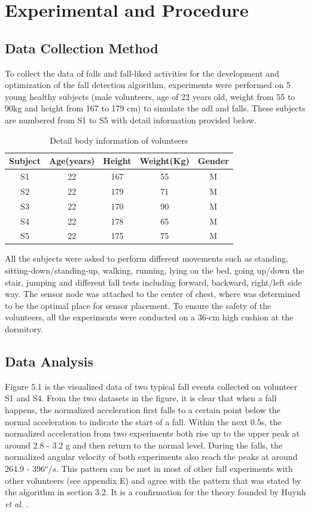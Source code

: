 \documentclass[letterpaper,12pt,titlepage,oneside,final]{book}
\begin{document}
\chapter{Experimental and Procedure}

\section{Data Collection Method}
To collect the data of falls and fall-liked activities for the development and optimization of the fall detection algorithm, experiments were performed on 5 young healthy subjects (male volunteers, age of 22 years old, weight from 55 to 90kg and height from 167 to 179 cm) to simulate the \gls{adl} and falls. These subjects are numbered from S1 to S5 with detail information provided below.
\begin{table}[h]
	\begin{center}
		\begin{tabular}{ |c|c|c|c|c| } 
			\hline
			Subject & Age(years) & Height & Weight(Kg) & Gender \\
			\hline
			S1 & 22 & 167 & 55 & M\\ %
			S2 & 22 & 179 & 71 & M\\ %
			S3 & 22 & 170 & 90 & M\\ %
			S4 & 22 & 178 & 65 & M\\ %
			S5 & 22 & 175 & 75 & M\\ %
			\hline
		\end{tabular}
		\caption{Detail body information of volunteers}
		\label{table:1}
	\end{center}
\end{table}\par
All the subjects were asked to perform different movements such as standing, sitting-down/standing-up, walking, running, lying on the bed, going up/down the stair, jumping and different fall tests including forward, backward, right/left side way. The sensor node was attached to the center of chest, where was determined to be the optimal place for sensor placement. To ensure the safety of the volunteers, all the experiments were conducted on a 36-cm high cushion at the dormitory.
\section{Data Analysis}
Figure 5.1 is the visualized data of two typical fall events collected on volunteer S1 and S4. From the two datasets in the figure, it is clear that when a fall happens, the normalized acceleration first falls to a certain point below the normal acceleration to indicate the start of a fall. Within the next 0.5s, the normalized acceleration from two experiments both rise up to the upper peak at around 2.8 - 3.2 g and then return to the normal level. During the falls, the normalized angular velocity of both experiments also reach the peaks at around 264.9 - 396$^{o}/s$. This pattern can be met in most of other fall experiments with other volunteers (see appendix E) and agree with the pattern that was stated by the algorithm in section 3.2. It is a confirmation for the theory founded by Huynh \textit{et al.} \cite{main_quoc}.\\
\end{document}
